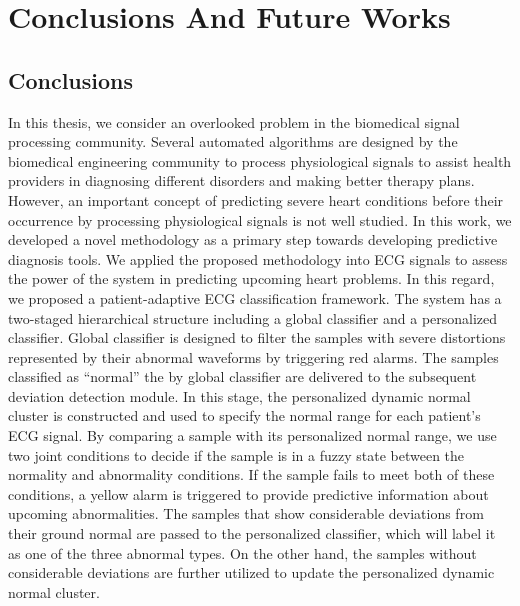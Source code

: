  \chapter{Conclusions And Future Works} \label{ch:Discussion And Resuls}
 
\section{Conclusions}
In this thesis, we consider an overlooked problem in the biomedical signal processing community. Several automated algorithms are designed by the biomedical engineering community to process physiological signals to assist health providers in diagnosing different disorders and making better therapy plans. However, an important concept of predicting severe heart conditions before their occurrence by processing physiological signals is not well studied. In this work, we developed a novel methodology as a primary step towards developing predictive diagnosis tools. We applied the proposed methodology into ECG signals to assess the power of the system in predicting upcoming heart problems.  
In this regard, we proposed a patient-adaptive ECG classification framework. The system has a two-staged hierarchical structure including a global classifier and a personalized classifier. Global classifier is designed to filter the samples with severe distortions represented by their abnormal waveforms by triggering red alarms. The samples classified as ``normal'' the by global classifier are delivered to the subsequent deviation detection module. In this stage, the personalized dynamic normal cluster is constructed and used to specify the normal range for each patient's ECG signal. By comparing a sample with its personalized normal range, we use two joint conditions to decide if the sample is in a fuzzy state between the normality and abnormality conditions. If the sample fails to meet both of these conditions, a yellow alarm is triggered to provide predictive information about upcoming abnormalities. The samples that show considerable deviations from their ground normal are passed to the personalized classifier, which will label it as one of the three abnormal types. On the other hand, the samples without considerable deviations are further utilized to update the personalized dynamic normal cluster.

